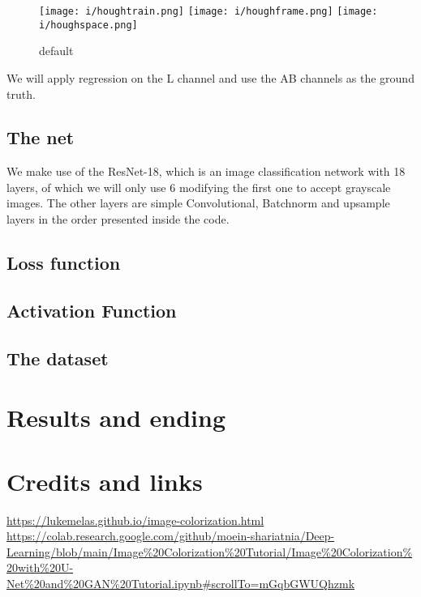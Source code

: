\documentclass{article}
\begin{document}
\begin{figure}[htp]

    \centering
    \texttt{[image: i/houghtrain.png]}\hfill
    \texttt{[image: i/houghframe.png]}\hfill
    \texttt{[image: i/houghspace.png]}
    
    \caption{default}
    \label{fig:figure 1. The LAB color space. L for including lightness and 
    AB for every other space}
    
    \end{figure}

We will apply regression on the L channel and use the AB channels as the 
ground truth. 

\subsection{The net}
We make use of the ResNet-18, which is an image classification network with 18
layers, of which we will only use 6 modifying the first one to accept grayscale
images. The other layers are simple Convolutional, Batchnorm and upsample 
layers in the order presented inside the code. 


\subsection{Loss function}

\subsection{Activation Function}
\subsection{}

\subsection{The dataset}


\section{Results and ending}


\section{Credits and links}
\url{https://lukemelas.github.io/image-colorization.html} \\ 
\url{https://colab.research.google.com/github/moein-shariatnia/Deep-Learning/blob/main/Image%20Colorization%20Tutorial/Image%20Colorization%20with%20U-Net%20and%20GAN%20Tutorial.ipynb#scrollTo=mGqbGWUQhzmk}
\end{document}
